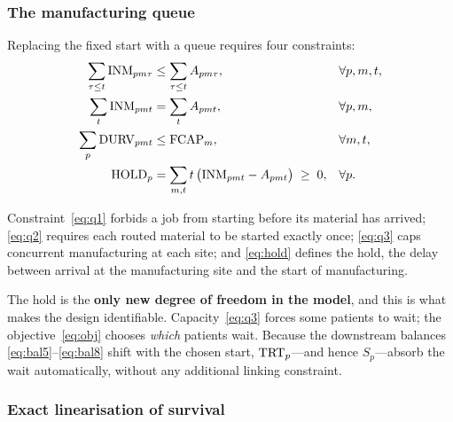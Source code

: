 \subsubsection{The manufacturing queue}
\label{sec:queue}

Replacing the fixed start with a queue requires four constraints:
\begin{align}
  \sum_{\tau \le t} \mathrm{INM}_{pm\tau} &\le \sum_{\tau \le t} A_{pm\tau},
      & &\forall p,m,t, \label{eq:q1}\\
  \sum_{t} \mathrm{INM}_{pmt} &= \sum_{t} A_{pmt}, & &\forall p,m, \label{eq:q2}\\
  \sum_{p} \mathrm{DURV}_{pmt} &\le \mathrm{FCAP}_m, & &\forall m,t, \label{eq:q3}\\
  \mathrm{HOLD}_p &= \sum_{m,t} t\,\bigl(\mathrm{INM}_{pmt} - A_{pmt}\bigr) \;\ge\; 0,
      & &\forall p. \label{eq:hold}
\end{align}

Constraint~\eqref{eq:q1} forbids a job from starting before its material has
arrived; \eqref{eq:q2} requires each routed material to be started exactly
once; \eqref{eq:q3} caps concurrent manufacturing at each site; and
\eqref{eq:hold} defines the hold, the delay between arrival at the
manufacturing site and the start of manufacturing.

The hold is the \textbf{only new degree of freedom in the model}, and this is
what makes the design identifiable. Capacity~\eqref{eq:q3} forces some
patients to wait; the objective~\eqref{eq:obj} chooses \emph{which} patients
wait. Because the downstream balances \eqref{eq:bal5}--\eqref{eq:bal8} shift
with the chosen start, $\mathrm{TRT}_p$---and hence $S_p$---absorb the wait
automatically, without any additional linking constraint.

\subsubsection{Exact linearisation of survival}
\label{sec:linearisation}

